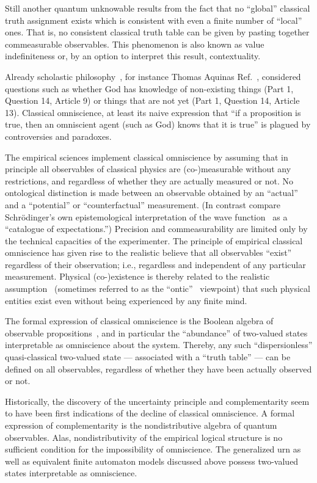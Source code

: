 \documentclass[rmp,amsfonts,showpacs,showkeys,twocolumn]{revtex4}
\begin{document}
Still another quantum unknowable results from the fact that no ``global'' classical truth
assignment exists which is consistent with even a finite number of ``local'' ones.
That is, no consistent classical truth table can be given by pasting together commeasurable observables.
This phenomenon is also known as value indefiniteness or, by an option to interpret this result, contextuality.

Already scholastic philosophy~\cite{specker-60},
for instance Thomas Aquinas  Ref.~\cite{Aquinas},
considered questions such as whether God has knowledge of non-existing things
(Part 1, Question 14, Article 9) or things
that are not yet (Part 1, Question 14, Article 13).
Classical omniscience, at least its naive expression that
``if a proposition is true, then an omniscient agent (such as God) knows that it is true''
is plagued by controversies and paradoxes.

The empirical sciences implement classical omniscience by assuming that
in principle all observables of classical physics are (co-)measurable without any restrictions,
and regardless of whether they are actually measured or not.
No ontological distinction is made between an observable obtained by an ``actual'' and a ``potential'' or ``counterfactual'' measurement.
(In contrast compare Schr\"odinger's own epistemological interpretation of the wave function~\cite[\S  7]{schrodinger} as a
``catalogue of expectations.'')
Precision and commeasurability are limited only by the technical capacities of the experimenter.
The principle of empirical classical omniscience has given rise to the realistic believe that
all observables ``exist'' regardless of their observation; i.e., regardless and independent of
any particular measurement.
Physical (co-)existence is thereby related to the realistic assumption~\cite{stace}
(sometimes referred to as the ``ontic''~\cite{atman:05} viewpoint) that such physical entities exist
even without being experienced by any finite mind.

The formal expression of classical omniscience is the Boolean algebra of observable propositions~\cite{Boole},
and in particular the ``abundance'' of two-valued states interpretable
as omniscience about the system.
Thereby, any such ``dispersionless'' quasi-classical two-valued state --- associated with a ``truth table''
--- can be defined on all observables,
regardless of whether they have been actually observed or not.

Historically, the discovery of the uncertainty principle and complementarity
seem to have been first indications of the decline of classical omniscience.
A formal expression of complementarity is the nondistributive algebra of quantum observables.
Alas,
nondistributivity of the empirical logical structure is no sufficient
condition for the impossibility of omniscience.
The generalized urn
as well as equivalent finite automaton models discussed above
possess two-valued states
interpretable as omniscience.
\end{document}
